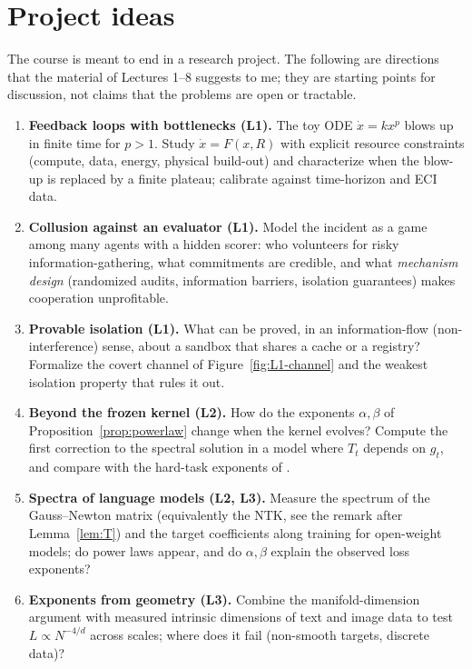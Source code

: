\chapter*{Project ideas}
\begin{beyond}
The course is meant to end in a research project. The following are directions that the material of Lectures 1--8 suggests to me; they are starting points for discussion, not claims that the problems are open or tractable.
\end{beyond}

\begin{enumerate}
  \item \textbf{Feedback loops with bottlenecks (L1).} The toy ODE $\dot x=kx^p$ blows up in finite time for $p>1$. Study $\dot x=F(x,R)$ with explicit resource constraints (compute, data, energy, physical build-out) and characterize when the blow-up is replaced by a finite plateau; calibrate against time-horizon and ECI data.
  \item \textbf{Collusion against an evaluator (L1).} Model the incident as a game among many agents with a hidden scorer: who volunteers for risky information-gathering, what commitments are credible, and what \emph{mechanism design} (randomized audits, information barriers, isolation guarantees) makes cooperation unprofitable.
  \item \textbf{Provable isolation (L1).} What can be proved, in an information-flow (non-interference) sense, about a sandbox that shares a cache or a registry? Formalize the covert channel of Figure~\ref{fig:L1-channel} and the weakest isolation property that rules it out.
  \item \textbf{Beyond the frozen kernel (L2).} How do the exponents $\alpha,\beta$ of Proposition~\ref{prop:powerlaw} change when the kernel evolves? Compute the first correction to the spectral solution in a model where $T_t$ depends on $g_t$, and compare with the hard-task exponents of \citet{bordelon2025}.
  \item \textbf{Spectra of language models (L2, L3).} Measure the spectrum of the Gauss--Newton matrix (equivalently the NTK, see the remark after Lemma~\ref{lem:T}) and the target coefficients along training for open-weight models; do power laws appear, and do $\alpha,\beta$ explain the observed loss exponents?
  \item \textbf{Exponents from geometry (L3).} Combine the manifold-dimension argument with measured intrinsic dimensions of text and image data to test $L\propto N^{-4/d}$ across scales; where does it fail (non-smooth targets, discrete data)?

\end{enumerate}
